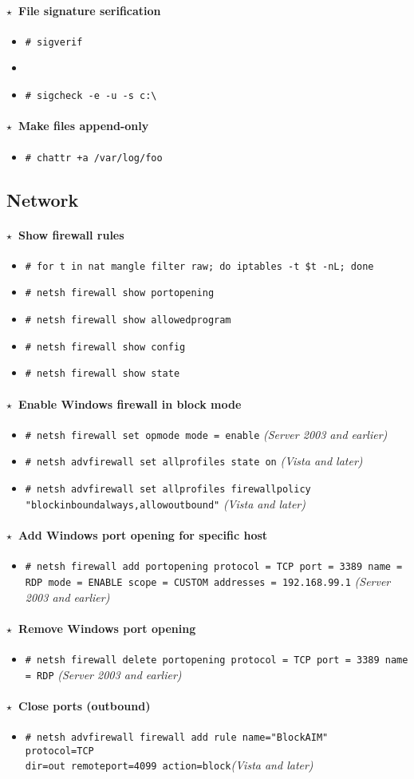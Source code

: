 \documentclass[10pt,landscape]{article}
\newcommand{\os}[1]{\texttt{\footnotesize{#1}}}
\newcommand{\linux}{\os{L}}
\newcommand{\windows}{\os{W}}
\newenvironment{action}[1]
  {\paragraph{$\star$~#1}\begin{itemize}[leftmargin=1cm]}
  {\end{itemize}}
\newcommand{\cmd}[2]{\item[#1] {\small\tt\# #2}}
\newcommand{\tool}[2]{\item[#1] {\footnotesize\sc{#2}}\xspace}
\begin{document}
\begin{multicols*}{3}
\begin{action}{File signature serification}
\cmd{\windows}{sigverif}
\tool{\windows}{sigcheck}
\cmd{\windows}{sigcheck -e -u -s c:{\textbackslash} }
\end{action}

\begin{action}{Make files append-only}
\cmd{\linux}{chattr +a /var/log/foo}
\end{action}

\subsection*{Network}

\begin{action}{Show firewall rules}
\cmd{\linux}{for t in nat mangle filter raw; do iptables -t \$t -nL; done}
\cmd{\windows}{netsh firewall show portopening}
\cmd{\windows}{netsh firewall show allowedprogram}
\cmd{\windows}{netsh firewall show config}
\cmd{\windows}{netsh firewall show state}
\end{action}

\begin{action}{Enable Windows firewall in block mode}
    \cmd{\windows}{netsh firewall set opmode mode = enable} \emph{(Server 2003 and earlier)}
    \cmd{\windows}{netsh advfirewall set allprofiles state on} \emph{(Vista and later)}
    \cmd{\windows}{netsh advfirewall set allprofiles firewallpolicy "blockinboundalways,allowoutbound"} \emph{(Vista and later)}
\end{action}

\begin{action}{Add Windows port opening for specific host}
\cmd{\windows}{netsh firewall add portopening protocol = TCP port = 3389 name = RDP mode = ENABLE scope = CUSTOM addresses = 192.168.99.1} \emph{(Server 2003 and earlier)}
\end{action}

\begin{action}{Remove Windows port opening}
\cmd{\windows}{netsh firewall delete portopening protocol = TCP port = 3389 name = RDP} \emph{(Server 2003 and earlier)}
\end{action}

\begin{action}{Close ports (outbound)}
\cmd{\windows}{netsh advfirewall firewall add rule name="BlockAIM" \\
protocol=TCP\\
dir=out remoteport=4099 action=block}\emph{(Vista and later)}
\end{action}


\end{multicols*}
\end{document}
